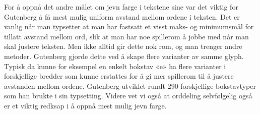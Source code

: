 
For å oppnå det andre målet om jevn farge i tekstene sine var det viktig for Gutenberg å få mest mulig uniform avstand mellom ordene i teksten. Det er vanlig når man typsetter at man har fastsatt et visst maks- og minimumsmål for tillatt avstand mellom ord, slik at man har noe spillerom å jobbe med når man skal justere teksten. Men ikke alltid gir dette nok rom, og man trenger andre metoder. Gutenberg gjorde dette ved å skape flere varianter av samme glyph. Typisk da kunne for eksempel en enkelt bokstav «e» ha flere varianter i forskjellige bredder som kunne erstattes for å gi mer spillerom til å justere avstanden mellom ordene. Gutenberg utviklet rundt 290 forskjellige bokstavtyper som han brukte i sin typsetting. Videre vet vi også at orddeling selvfølgelig også er et viktig redksap i å oppnå mest mulig jevn farge.

